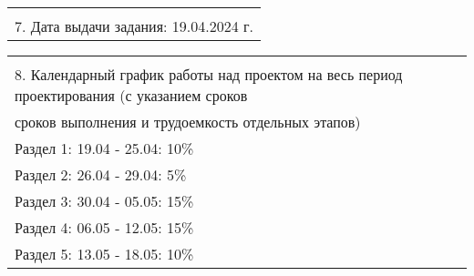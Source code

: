 \documentclass[12pt, А4, twoside]{article}
\begin{document}
\begin{FlushLeft}
    \begin{tabular}{p{17.25cm}} 
        \vspace{1pt} \hline \\
        \textsf{7. Дата выдачи задания: 19.04.2024 г.} \vspace{1pt} \hline \\
    \end{tabular} 

    \begin{tabular}{p{17.25cm}} 
        \vspace{1pt} \hline \\
        \textsf{8. Календарный график работы над проектом на весь период проектирования (с указанием сроков} \vspace{1pt} \hline \\
        \textsf{сроков выполнения и трудоемкость отдельных этапов)} \vspace{1pt} \hline \\
        \hspace{0.3cm} \textsf{Раздел 1:} \hspace{2.54cm} \textsf{ 19.04 - 25.04:} \hspace{0.5cm} \textsf{10\%} \vspace{1pt} \hline \\
        \hspace{0.3cm} \textsf{Раздел 2:} \hspace{2.54cm} \textsf{ 26.04 - 29.04:} \hspace{0.5cm} \textsf{5\%} \vspace{1pt} \hline \\
        \hspace{0.3cm} \textsf{Раздел 3:} \hspace{2.54cm} \textsf{ 30.04 - 05.05:} \hspace{0.5cm} \textsf{15\%} \vspace{1pt} \hline \\
        \hspace{0.3cm} \textsf{Раздел 4:} \hspace{2.54cm} \textsf{ 06.05 - 12.05:} \hspace{0.5cm} \textsf{15\%} \vspace{1pt} \hline \\
        \hspace{0.3cm} \textsf{Раздел 5:} \hspace{2.54cm} \textsf{ 13.05 - 18.05:} \hspace{0.5cm} \textsf{10\%} \vspace{1pt} \hline \\

\end{tabular}
\end{FlushLeft}
\end{document}
